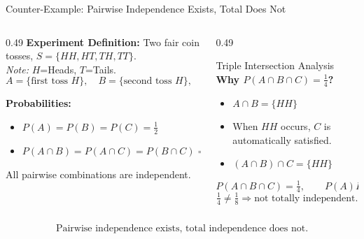 \documentclass[light]{lutbeamer}
\begin{document}
\begin{frame}[fragile]{Counter-Example: Pairwise Independence Exists, Total Does Not}
    \footnotesize
    \begin{columns}[T,onlytextwidth]
        \begin{column}{0.49\textwidth}
            \textbf{Experiment Definition:} Two fair coin tosses, \(S=\{HH,HT,TH,TT\}\).\\
            \textit{Note:} \(H\)=Heads, \(T\)=Tails.
            \[
            A=\{\text{first toss }H\},\quad
            B=\{\text{second toss }H\},\quad
            C=\{\text{two tosses same}\}
            \]

            \textbf{Probabilities:}
            \begin{itemize}\itemsep2pt
                \item \(P(A)=P(B)=P(C)=\tfrac{1}{2}\)
                \item \(P(A\cap B)=P(A\cap C)=P(B\cap C)=\tfrac{1}{4}\)
            \end{itemize}
            All pairwise combinations are independent.
        \end{column}
        \begin{column}{0.49\textwidth}
            \begin{alertblock}{Triple Intersection Analysis}
                \textbf{Why \(P(A \cap B \cap C)=\tfrac{1}{4}\)?}
                \begin{itemize}\itemsep2pt
                    \item \(A \cap B = \{HH\}\)
                    \item When \(HH\) occurs, \(C\) is automatically satisfied.
                    \item \((A \cap B) \cap C = \{HH\}\)
                \end{itemize}
                \[
                P(A \cap B \cap C)=\tfrac{1}{4},\qquad
                P(A)P(B)P(C)=\tfrac{1}{8}
                \]
                \[
                \tfrac{1}{4} \neq \tfrac{1}{8}\Rightarrow \text{not totally independent.}
                \]
            \end{alertblock}
        \end{column}
    \end{columns}

    \[
    \boxed{\text{Pairwise independence exists, total independence does not.}}
    \]
\end{frame}
\end{document}
